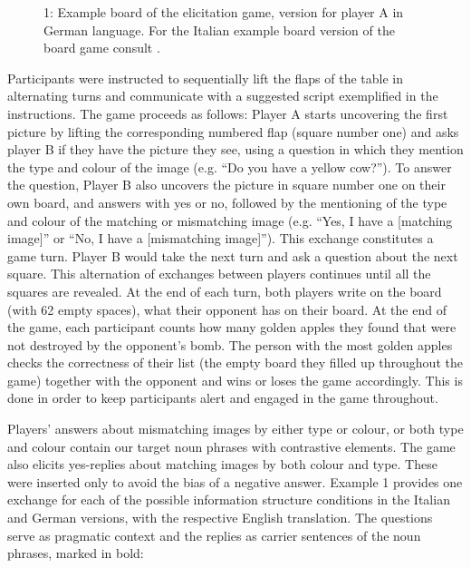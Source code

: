    
 

\begin{stylecaption}\begin{figure}
\caption{1: Example board of the elicitation game, version for player A in German language. For the Italian example board version of the board game consult \citet{SbrannaEtAl2023}.}
\label{fig:key:2}
\end{figure}\end{stylecaption}

Participants were instructed to sequentially lift the flaps of the table in alternating turns and communicate with a suggested script exemplified in the instructions. The game proceeds as follows: Player A starts uncovering the first picture by lifting the corresponding numbered flap (square number one) and asks player B if they have the picture they see, using a question in which they mention the type and colour of the image (e.g. “Do you have a yellow cow?”). To answer the question, Player B also uncovers the picture in square number one on their own board, and answers with yes or no, followed by the mentioning of the type and colour of the matching or mismatching image (e.g. “Yes, I have a [matching image]” or “No, I have a [mismatching image]”). This exchange constitutes a game turn. Player B would take the next turn and ask a question about the next square. This alternation of exchanges between players continues until all the squares are revealed. At the end of each turn, both players write on the board (with 62 empty spaces), what their opponent has on their board. At the end of the game, each participant counts how many golden apples they found that were not destroyed by the opponent’s bomb. The person with the most golden apples checks the correctness of their list (the empty board they filled up throughout the game) together with the opponent and wins or loses the game accordingly. This is done in order to keep participants alert and engaged in the game throughout.

Players’ answers about mismatching images by either type or colour, or both type and colour contain our target noun phrases with contrastive elements. The game also elicits yes-replies about matching images by both colour and type. These were inserted only to avoid the bias of a negative answer. Example 1 provides one exchange for each of the possible information structure conditions in the Italian and German versions, with the respective English translation. The questions serve as pragmatic context and the replies as carrier sentences of the noun phrases, marked in bold:

